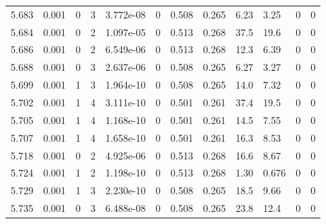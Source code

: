\documentclass[preview]{standalone}
\begin{document}
{{{{{{{{{{{{{{{\begin{tabular}{L{1.2cm}C{1.2cm} C{0.3cm}C{0.5cm} C{1.4cm}C{1.4cm} C{1.4cm}C{1.4cm} C{1.6cm}C{1.6cm} C{1.6cm}C{1.6cm}}
  5.683  &  0.001  & 0     &  3 &  3.772e-08  & 0  &  0.508&   0.265& 6.23 & 3.25   &  0 & 0  \\ 
  5.684  &  0.001  & 0     &  2 &  1.097e-05  & 0  &  0.513&   0.268& 37.5 & 19.6   &  0 & 0  \\ 
  5.686  &  0.001  & 0     &  2 &  6.549e-06  & 0  &  0.513&   0.268& 12.3 & 6.39   &  0 & 0  \\ 
  5.688  &  0.001  & 0     &  3 &  2.637e-06  & 0  &  0.508&   0.265& 6.27 & 3.27   &  0 & 0  \\ 
  5.699  &  0.001  & 1     &  3 &  1.964e-10  & 0  &  0.508&   0.265& 14.0 & 7.32   &  0 & 0  \\ 
  5.702  &  0.001  & 1     &  4 &  3.111e-10  & 0  &  0.501&   0.261& 37.4 & 19.5   &  0 & 0  \\ 
  5.705  &  0.001  & 1     &  4 &  1.168e-10  & 0  &  0.501&   0.261& 14.5 & 7.55   &  0 & 0  \\ 
  5.707  &  0.001  & 1     &  4 &  1.658e-10  & 0  &  0.501&   0.261& 16.3 & 8.53   &  0 & 0  \\ 
  5.718  &  0.001  & 0     &  2 &  4.925e-06  & 0  &  0.513&   0.268& 16.6 & 8.67   &  0 & 0  \\ 
  5.724  &  0.001  & 1     &  2 &  1.198e-10  & 0  &  0.513&   0.268& 1.30 & 0.676   &  0 & 0  \\ 
  5.729  &  0.001  & 1     &  3 &  2.230e-10  & 0  &  0.508&   0.265& 18.5 & 9.66   &  0 & 0  \\ 
  5.735  &  0.001  & 0     &  3 &  6.488e-08  & 0  &  0.508&   0.265& 23.8 & 12.4   &  0 & 0  \\ 
\hline 
\end{tabular} 

}}}}}}}}}}}}}}}
\end{document}
